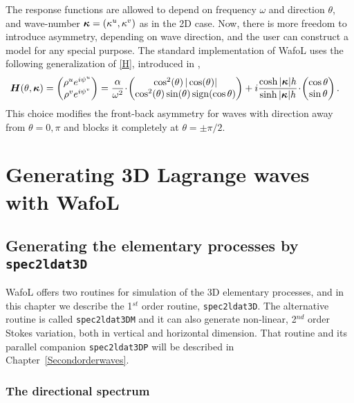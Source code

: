 The response functions are allowed to depend on frequency $\omega$ and direction $\theta$,  and wave-number $\boldsymbol{\kappa} = (\kappa ^u, \kappa ^v) $ as in the 2D case. Now, there is more freedom to introduce asymmetry, depending on wave direction, and the user  can construct a model for any special purpose. The standard implementation of {\sc Wafo}L uses the following generalization of \eqref{H}, introduced in \cite[Eqn. (10)]{LindgrenAndLindgren2011Stochastic},
\begin{align}
\mbox{\boldmath $H$}(\theta, \boldsymbol{\kappa}) &=
\begin{pmatrix}
\rho^u e^{i \psi^u} \\
\rho^v e^{i \psi^v}
\end{pmatrix} =
\frac{\alpha}{\omega^2}\! \cdot \! \begin{pmatrix}
 \cos^2 (\theta)\, |\cos (\theta)| \\
\cos^2(\theta) \sin (\theta) \operatorname{sign}(\cos \theta)
\end{pmatrix}
+ i \frac{\cosh |\boldsymbol{\kappa}| h}{\sinh |\boldsymbol{\kappa}| h} \! \cdot \!
\begin{pmatrix}\cos \theta \\ \sin \theta \end{pmatrix}.
\label{specialtransfer}
\end{align}
This choice modifies the front-back asymmetry for waves with direction away from $\theta = 0, \pi$ and blocks it completely at $\theta = \pm \pi/2$.

\section{Generating 3D Lagrange waves with {\sc Wafo}L}
\subsection{Generating the elementary processes by {\tt spec2ldat3D}}
{\sc Wafo}L offers two routines for simulation of the 3D 
elementary processes, and 
in this chapter we describe the 1$^{st}$ order routine, {\tt spec2ldat3D}. 
The alternative routine is called {\tt spec2ldat3DM} and it can also generate 
non-linear, 2$^{nd}$ order Stokes variation, both in vertical and horizontal dimension. 
That routine and its parallel companion {\tt spec2ldat3DP} will be described in Chapter~\ref{Secondorderwaves}. 

\subsubsection*{The directional spectrum}


